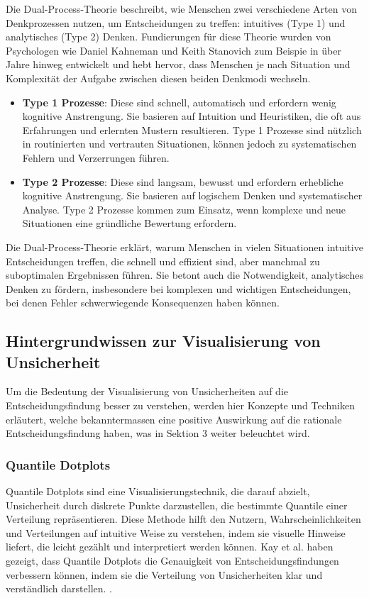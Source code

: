 Die Dual-Process-Theorie beschreibt, wie Menschen zwei verschiedene Arten von Denkprozessen nutzen, um Entscheidungen zu treffen: 
intuitives (Type 1) und analytisches (Type 2) Denken. Fundierungen für diese Theorie wurden von Psychologen wie Daniel Kahneman und Keith 
Stanovich zum Beispie in \cite{Tversky74} über Jahre hinweg entwickelt und hebt hervor, dass Menschen je nach Situation und 
Komplexität der Aufgabe zwischen diesen beiden Denkmodi wechseln.

\begin{itemize}
    \item \textbf{Type 1 Prozesse}: Diese sind schnell, automatisch und erfordern wenig kognitive Anstrengung. 
    Sie basieren auf Intuition und Heuristiken, die oft aus Erfahrungen und erlernten Mustern resultieren. 
    Type 1 Prozesse sind nützlich in routinierten und vertrauten Situationen, können jedoch zu systematischen 
    Fehlern und Verzerrungen führen.
    \item \textbf{Type 2 Prozesse}: Diese sind langsam, bewusst und erfordern erhebliche kognitive Anstrengung. 
    Sie basieren auf logischem Denken und systematischer Analyse. Type 2 Prozesse kommen zum Einsatz, wenn komplexe 
    und neue Situationen eine gründliche Bewertung erfordern.
\end{itemize}

Die Dual-Process-Theorie erklärt, warum Menschen in vielen Situationen intuitive Entscheidungen treffen, die schnell und effizient 
sind, aber manchmal zu suboptimalen Ergebnissen führen. Sie betont auch die Notwendigkeit, analytisches Denken zu fördern, 
insbesondere bei komplexen und wichtigen Entscheidungen, bei denen Fehler schwerwiegende Konsequenzen haben können.


\subsection{Hintergrundwissen zur Visualisierung von Unsicherheit}

Um die Bedeutung der Visualisierung von Unsicherheiten auf die Entscheidungsfindung besser zu verstehen, werden hier
Konzepte und Techniken erläutert, welche bekanntermassen eine positive Auswirkung auf die rationale Entscheidungsfindung haben, 
was in Sektion 3 weiter beleuchtet wird.

\subsubsection{Quantile Dotplots}
Quantile Dotplots sind eine Visualisierungstechnik, die darauf abzielt, Unsicherheit durch diskrete Punkte darzustellen, 
die bestimmte Quantile einer Verteilung repräsentieren. Diese Methode hilft den Nutzern, Wahrscheinlichkeiten und Verteilungen 
auf intuitive Weise zu verstehen, indem sie visuelle Hinweise liefert, die leicht gezählt und interpretiert werden können. 
Kay et al. haben gezeigt, dass Quantile Dotplots die Genauigkeit von Entscheidungsfindungen verbessern können, indem sie die 
Verteilung von Unsicherheiten klar und verständlich darstellen. \cite{Kay2016}.

